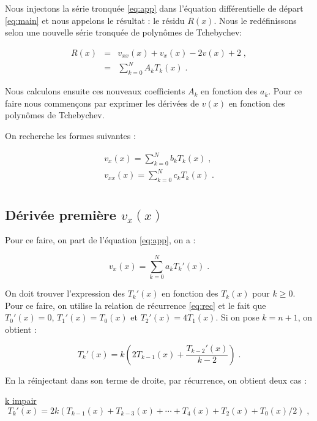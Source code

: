 \documentclass{report}
\begin{document}
Nous injectons la série tronquée \eqref{eq:app} dans l'équation différentielle de départ \eqref{eq:main} et nous appelons le résultat : le résidu $R(x)$. Nous le redéfinissons selon une nouvelle série tronquée de polynômes de Tchebychev:

\begin{eqnarray}
R(x) & = & v_{xx}(x) + v_x(x) - 2v(x) + 2\;, \\
& = & \sum_{k=0}^N A_{k} T_{k}(x)\;. \label{eq:reste}
\end{eqnarray}

Nous calculons ensuite ces nouveaux coefficients $A_{k}$ en fonction des $a_{k}$. Pour ce faire nous commençons par exprimer les dérivées de $v(x)$ en fonction des polynômes de Tchebychev.

On recherche les formes suivantes : 

\begin{eqnarray}
v_{x}(x) = \sum_{k=0}^N b_k T_k(x)\;, \label{eq:vxb}\\
v_{xx}(x) = \sum_{k=0}^N c_k T_k(x)\;. \\
\end{eqnarray}

\subsection*{Dérivée première $v_{x}(x)$}

Pour ce faire, on part de l'équation \eqref{eq:app}, on a :

\begin{equation}
v_{x}(x) = \sum_{k=0}^N a_k T_{k}'(x)\;.\label{eq:vxa}
\end{equation}

On doit trouver l'expression des $T_{k}'(x)$ en fonction des $T_{k}(x)$ pour $k \geq 0$. Pour ce faire, on utilise la relation de récurrence \eqref{eq:rec} et le fait que $T_0' (x) = 0$, $T_1' (x) = T_0 (x)$ et $T_2' (x) = 4T_1 (x)$. Si on pose $k=n+1$, on obtient :

\begin{equation}
T_{k}'(x)  = k\left(2T_{k-1}(x)+\frac{T_{k-2}'(x)}{k-2}\right)\;.
\end{equation}

En la réinjectant dans son terme de droite, par récurrence, on obtient deux cas :

\underline{k impair}
\begin{equation}
T_{k}'(x)  = 2k\left(T_{k-1}(x)+T_{k-3}(x)+\cdots+T_{4}(x)+T_{2}(x)+T_{0}(x)/2\right)\;,\label{eq:kimpair}
\end{equation}
\end{document}
